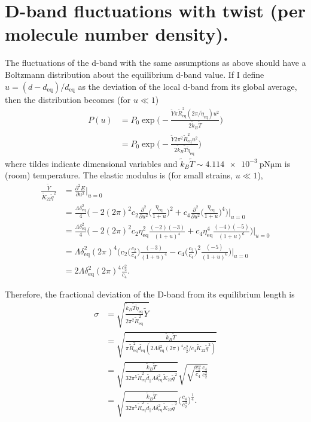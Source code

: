 \documentclass[12pt]{article}
\begin{document}
\section{D-band fluctuations with twist (per molecule number density).}
The fluctuations of the d-band with the same assumptions as above should have a Boltzmann distribution about the equilibrium d-band value. If I define $u=(d-d_{\mathrm{eq}})/d_{\mathrm{eq}}$ as the deviation of the local d-band from its global average, then the distribution becomes (for $u\ll 1$)
\begin{align}
P(u)&=P_0\exp\bigg(-\frac{\tilde{Y}\pi\tilde{R}_{\mathrm{eq}}^2(2\pi/\tilde{\eta}_{\mathrm{eq}})u^2}{2\tilde{k}_B\tilde{T}}\bigg)\nonumber\\
&=P_0\exp\bigg(-\frac{\tilde{Y}2\pi^2\tilde{R}_{\mathrm{eq}}^2u^2}{2\tilde{k}_B\tilde{T}\tilde{\eta}_{\mathrm{eq}}}\bigg)
\end{align}
where tildes indicate dimensional variables and $\tilde{k}_B\tilde{T}\sim\SI{4.114e-3}{\pico\newton\micro\meter}$ is (room) temperature. The elastic modulus is (for small strains, $u\ll 1$),
\begin{align}
\frac{\tilde{Y}}{\tilde{K}_{22}\tilde{q}^2}&=\frac{\partial^2E}{\partial u^2}\bigg|_{u=0}\nonumber\\
&=\frac{\Lambda\delta_{\mathrm{eq}}^2}{4}\bigg(-2(2\pi)^2c_2\frac{\partial^2}{\partial u^2}\bigg(\frac{\eta_{\mathrm{eq}}}{1+u}\bigg)^2+c_4\frac{\partial^2}{\partial u^2}\bigg(\frac{\eta_{\mathrm{eq}}}{1+u}\bigg)^4\bigg)\bigg|_{u=0}\nonumber\\
&=\frac{\Lambda\delta_{\mathrm{eq}}^2}{4}\bigg(-2(2\pi)^2c_2\eta_{\mathrm{eq}}^2\frac{(-2)(-3)}{(1+u)^4}+c_4\eta_{\mathrm{eq}}^4\frac{(-4)(-5)}{(1+u)^6}\bigg)\bigg|_{u=0}\nonumber\\
&=\Lambda\delta_{\mathrm{eq}}^2(2\pi)^4\bigg(c_2\bigg(\frac{c_2}{c_4}\bigg)\frac{(-3)}{(1+u)^4}-c_4\bigg(\frac{c_2}{c_4}\bigg)^2\frac{(-5)}{(1+u)^6}\bigg)\bigg|_{u=0}\nonumber\\
&=2\Lambda\delta_{\mathrm{eq}}^2(2\pi)^4\frac{c_2^2}{c_4}.
\end{align}

Therefore, the fractional deviation of the D-band from its equilibrium length is
\begin{align}\label{eq:sigma}
\sigma&=\sqrt{\frac{\tilde{k}_B\tilde{T}\tilde{\eta}_{\mathrm{eq}}}{2\pi^2\tilde{R}_{\mathrm{eq}}^2}\tilde{Y}}\nonumber\\
&=\sqrt{\frac{\tilde{k}_B\tilde{T}}{\pi\tilde{R}_{\mathrm{eq}}^2\tilde{d_{\mathrm{eq}}}(2\Lambda\delta_{\mathrm{eq}}^2(2\pi)^4c_2^2/c_4\tilde{K}_{22}\tilde{q}^2)}}\nonumber\\
&=\sqrt{\frac{\tilde{k}_B\tilde{T}}{32\pi^5\tilde{R}_{\mathrm{eq}}^2\tilde{d_{\parallel}}\Lambda\delta_{\mathrm{eq}}^2\tilde{K}_{22}\tilde{q}^2}}\sqrt{\sqrt{\frac{c_2}{c_4}}\frac{c_4}{c_2^2}}\nonumber\\
&=\sqrt{\frac{\tilde{k}_B\tilde{T}}{32\pi^5\tilde{R}_{\mathrm{eq}}^2\tilde{d_{\parallel}}\Lambda\delta_{\mathrm{eq}}^2\tilde{K}_{22}\tilde{q}^2}}\bigg(\frac{c_4}{c_2^3}\bigg)^{\frac{1}{4}}.
\end{align}
\end{document}
